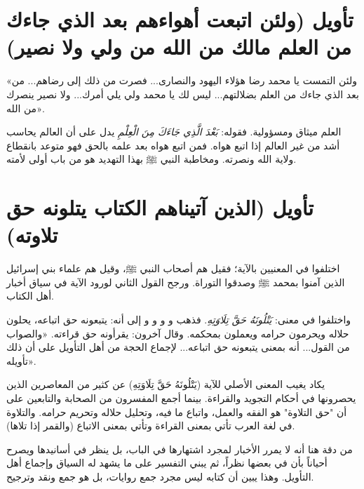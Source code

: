 \separator

\section{تأويل (ولئن اتبعت أهواءهم بعد الذي جاءك من العلم مالك من الله من ولي ولا نصير)}
 «ولئن التمست يا محمد رضا هؤلاء اليهود والنصارى... فصرت من ذلك إلى رضاهم... من بعد الذي جاءك من العلم بضلالتهم... ليس لك يا محمد ولي يلي أمرك... ولا نصير ينصرك من الله».

\begin{fawaid}
العلم ميثاق ومسؤولية. فقوله: \textit{بَعْدَ الَّذِي جَاءَكَ مِنَ الْعِلْمِ} يدل على أن العالم يحاسب أشد من غير العالم إذا اتبع هواه. فمن اتبع هواه بعد علمه بالحق فهو متوعد بانقطاع ولاية الله ونصرته. ومخاطبة النبي ﷺ بهذا التهديد هو من باب أولى لأمته.
\end{fawaid}

\separator

\section{تأويل (الذين آتيناهم الكتاب يتلونه حق تلاوته)}
اختلفوا في المعنيين بالآية؛ فقيل هم أصحاب النبي ﷺ، وقيل هم علماء بني إسرائيل الذين آمنوا بمحمد ﷺ وصدقوا التوراة. ورجح  القول الثاني لورود الآية في سياق أخبار أهل الكتاب.

واختلفوا في معنى: \textit{يَتْلُونَهُ حَقَّ تِلَاوَتِهِ}. فذهب  و و و و إلى أنه: يتبعونه حق اتباعه، يحلون حلاله ويحرمون حرامه ويعملون بمحكمه. وقال آخرون: يقرأونه حق قراءته.
 «والصواب من القول... أنه بمعنى يتبعونه حق اتباعه... لإجماع الحجة من أهل التأويل على أن ذلك تأويله».

\begin{fawaid}
يكاد يغيب المعنى الأصلي للآية (يَتْلُونَهُ حَقَّ تِلَاوَتِهِ) عن كثير من المعاصرين الذين يحصرونها في أحكام التجويد والقراءة. بينما أجمع المفسرون من الصحابة والتابعين على أن "حق التلاوة" هو الفقه والعمل، واتباع ما فيه، وتحليل حلاله وتحريم حرامه. والتلاوة في لغة العرب تأتي بمعنى القراءة وتأتي بمعنى الاتباع (والقمر إذا تلاها).
\end{fawaid}

\begin{fawaid}
من دقة  هنا أنه لا يمرر الأخبار لمجرد اشتهارها في الباب، بل ينظر في أسانيدها ويصرح أحياناً بأن في بعضها نظراً، ثم يبني التفسير على ما يشهد له السياق وإجماع أهل التأويل. وهذا يبين أن كتابه ليس مجرد جمع روايات، بل هو جمع ونقد وترجيح.
\end{fawaid}

